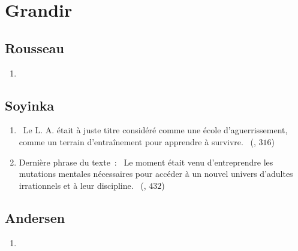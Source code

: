\documentclass[a4paper, 11pt, hidelinks]{article}
\newcommand{\rb}[1]{\Romanbar{#1}}
\begin{document}
\section{Grandir}



\subsection{Rousseau}

\begin{enumerate}
    \item 
\end{enumerate}


\subsection{Soyinka}


\begin{enumerate}
    \item \og{} Le L. A. était à juste titre considéré comme une école d’aguerrissement, comme un terrain d’entraînement pour apprendre à survivre. \fg{} (\rb{12}, $316$)
    \item Dernière phrase du texte : \og{} Le moment était venu d’entreprendre les mutations mentales nécessaires pour accéder à un nouvel univers d’adultes irrationnels et à leur discipline. \fg{} (\rb{15}, $432$)
\end{enumerate}


\subsection{Andersen}


\begin{enumerate}
    \item 
\end{enumerate}
\end{document}
